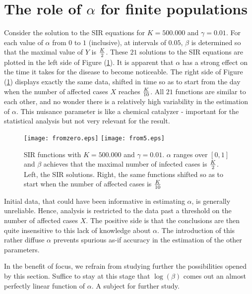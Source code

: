 \documentclass{article}
\begin{document}
\section{The role of $\alpha$ for finite populations}
Consider the solution to the SIR equations for $K=500.000$ and $\gamma=0.01$. For each value of $\alpha$ from $0$ to $1$ (inclusive), at intervals of $0.05$, $\beta$ is determined so that the maximal value of $Y$ is ${K \over 2}$. These $21$ solutions to the SIR equations are plotted in the left side of Figure (\ref{fromtimes}). It is apparent that $\alpha$ has a strong effect on the time it takes for the disease to become noticeable. The right side of Figure (\ref{fromtimes}) displays exactly the same data, shifted in time so as to start from the day when the number of affected cases $X$ reaches ${K \over 10}$. All $21$ functions are similar to each other, and no wonder there is a relatively high variability in the estimation of $\alpha$. This nuisance parameter is like a chemical catalyzer - important for the statistical analysis but not very relevant for the result.
\begin{figure}
	
	\begin{center}
		{\texttt{[image: fromzero.eps]}}
		\qquad
		{\texttt{[image: from5.eps]}}
		\end{center}
		\begin{center}
	\caption{SIR functions with $K=500.000$ and $\gamma=0.01$. $\alpha$ ranges over $[0,1]$ and $\beta$ achieves that the maximal number of infected cases is ${K \over 2}$. Left, the SIR solutions. Right, the same functions shifted so as to start when the number of affected cases is ${K \over 10}$
	}
	\label{fromtimes}
	\end{center}
\end{figure}
	
	
	Initial data, that could have been informative in estimating $\alpha$, is generally unreliable. Hence, analysis is restricted to the data past a threshold on the number of affected cases $X$. The positive side is that the conclusions are then quite insensitive to this lack of knowledge about $\alpha$. The introduction of this rather diffuse $\alpha$ prevents spurious as-if accuracy in the estimation of the other parameters.
	
	In the benefit of focus, we refrain from studying further the possibilities opened by this section. Suffice to stay at this stage that $\log(\beta)$ comes out an almost perfectly linear function of $\alpha$. A subject for further study.
	
\end{document}
